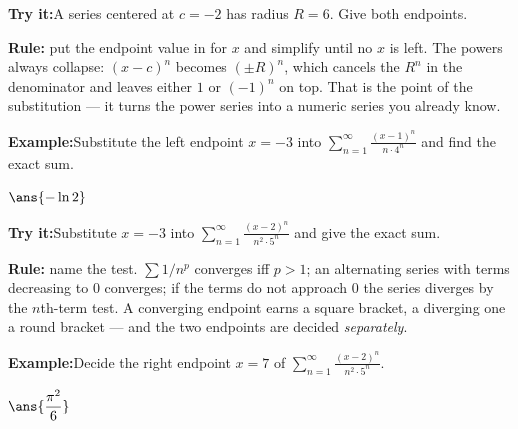 \documentclass[12pt]{article}
\begin{document}
\begin{tryitbox}
\textbf{Try it:}\quad A series centered at $c = -2$ has radius $R = 6$. Give
both endpoints.\\[2pt]
\end{tryitbox}


\begin{formulabox}
\textbf{Rule:} put the endpoint value in for $x$ and simplify until no $x$ is
left. The powers always collapse: $(x-c)^n$ becomes $(\pm R)^n$, which cancels
the $R^n$ in the denominator and leaves either $1$ or $(-1)^n$ on top. That is
the point of the substitution --- it turns the power series into a numeric
series you already know.
\end{formulabox}

\begin{examplebox}
\textbf{Example:}\quad Substitute the left endpoint $x = -3$ into
$\displaystyle\sum_{n=1}^{\infty} \frac{(x-1)^n}{n \cdot 4^n}$ and find the
exact sum.

$\ans{-\ln 2}$
\end{examplebox}

\begin{tryitbox}
\textbf{Try it:}\quad Substitute $x = -3$ into $\displaystyle\sum_{n=1}^{\infty}
\frac{(x-2)^n}{n^2 \cdot 5^n}$ and give the exact sum.\\[2pt]
\end{tryitbox}


\begin{formulabox}
\textbf{Rule:} name the test. $\sum 1/n^p$ converges iff $p > 1$; an
alternating series with terms decreasing to $0$ converges; if the terms do not
approach $0$ the series diverges by the $n$th-term test. A converging endpoint
earns a square bracket, a diverging one a round bracket --- and the two
endpoints are decided \emph{separately}.
\end{formulabox}

\begin{examplebox}
\textbf{Example:}\quad Decide the right endpoint $x = 7$ of
$\displaystyle\sum_{n=1}^{\infty} \frac{(x-2)^n}{n^2 \cdot 5^n}$.

$\ans{\dfrac{\pi^2}{6}}$
\end{examplebox}
\end{document}
